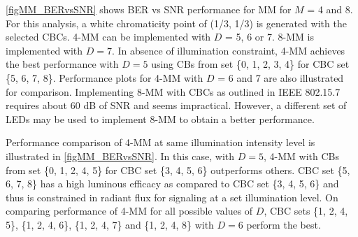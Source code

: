 \figurename{ \ref{figMM_BERvsSNR}} shows BER vs SNR performance for MM for $M$ = 4 and 8. For this analysis, a white chromaticity point of (1/3, 1/3) is generated with the selected CBCs. 4-MM can be implemented with $D$ = 5, 6 or 7. 8-MM is implemented with $D=7$. In absence of illumination constraint, 4-MM achieves the best performance with $D=5$ using CBs from set \{0, 1, 2, 3, 4\} for CBC set \{5, 6, 7, 8\}. Performance plots for 4-MM with $D$ = 6 and 7 are also illustrated for comparison. Implementing 8-MM with CBCs as outlined in IEEE 802.15.7 requires about 60 dB of SNR and seems impractical. However, a different set of LEDs may be used to implement 8-MM to obtain a better performance.

Performance comparison of 4-MM at same illumination intensity level is illustrated in \figurename{ \ref{figMM_BERvsSNR}}. In this case, with $D=5$, 4-MM with CBs from set \{0, 1, 2, 4, 5\} for CBC set \{3, 4, 5, 6\} outperforms others.  CBC set \{5, 6, 7, 8\} has a high luminous efficacy as compared to  CBC set \{3, 4, 5, 6\} and thus is constrained in radiant flux for signaling at a set illumination level. On comparing performance of 4-MM for all possible values of $D$, CBC sets \{1, 2, 4, 5\}, \{1, 2, 4, 6\}, \{1, 2, 4, 7\} and \{1, 2, 4, 8\} with $D=6$ perform the best.